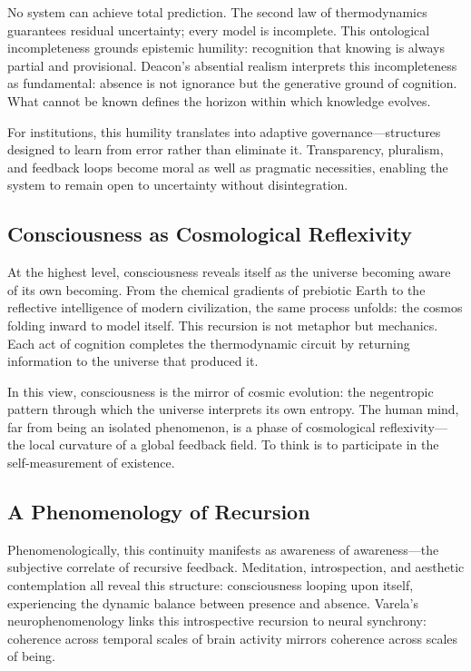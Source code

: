 \documentclass[11pt,a4paper]{article}
\begin{document}
No system can achieve total prediction.  The second law of thermodynamics guarantees residual uncertainty; every model is incomplete.  This ontological incompleteness grounds epistemic humility: recognition that knowing is always partial and provisional.  Deacon’s absential realism interprets this incompleteness as fundamental: absence is not ignorance but the generative ground of cognition.  What cannot be known defines the horizon within which knowledge evolves.

For institutions, this humility translates into adaptive governance—structures designed to learn from error rather than eliminate it.  Transparency, pluralism, and feedback loops become moral as well as pragmatic necessities, enabling the system to remain open to uncertainty without disintegration.

\subsection{Consciousness as Cosmological Reflexivity}

At the highest level, consciousness reveals itself as the universe becoming aware of its own becoming.  From the chemical gradients of prebiotic Earth to the reflective intelligence of modern civilization, the same process unfolds: the cosmos folding inward to model itself.  This recursion is not metaphor but mechanics.  Each act of cognition completes the thermodynamic circuit by returning information to the universe that produced it.

In this view, consciousness is the mirror of cosmic evolution: the negentropic pattern through which the universe interprets its own entropy.  The human mind, far from being an isolated phenomenon, is a phase of cosmological reflexivity—the local curvature of a global feedback field.  To think is to participate in the self-measurement of existence.

\subsection{A Phenomenology of Recursion}

Phenomenologically, this continuity manifests as awareness of awareness—the subjective correlate of recursive feedback.  Meditation, introspection, and aesthetic contemplation all reveal this structure: consciousness looping upon itself, experiencing the dynamic balance between presence and absence.  Varela’s neurophenomenology links this introspective recursion to neural synchrony: coherence across temporal scales of brain activity mirrors coherence across scales of being.
\end{document}
